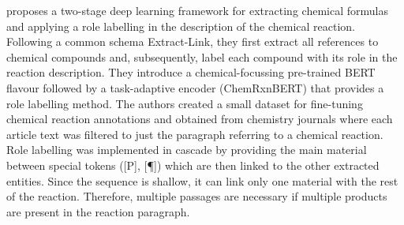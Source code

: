 \cite{guo2021automated} proposes a two-stage deep learning framework for extracting chemical formulas and applying a role labelling in the description of the chemical reaction. 
Following a common schema Extract-Link, they first extract all references to chemical compounds and, subsequently, label each compound with its role in the reaction description. 
They introduce a chemical-focussing pre-trained BERT flavour followed by a task-adaptive encoder (ChemRxnBERT) that provides a role labelling method. 
The authors created a small dataset for fine-tuning chemical reaction annotations and obtained from chemistry journals where each article text was filtered to just the paragraph referring to a chemical reaction. 
Role labelling was implemented in cascade by providing the main material between special tokens ([P], [\P]) which are then linked to the other extracted entities. Since the sequence is shallow, it can link only one material with the rest of the reaction. Therefore, multiple passages are necessary if multiple products are present in the reaction paragraph.  






